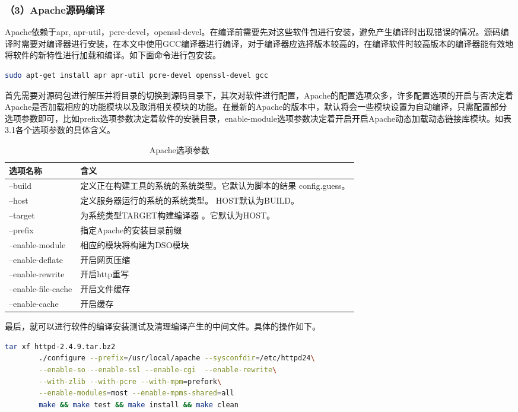 		\subsubsection{（3）Apache源码编译}
		Apache依赖于apr, apr-util，pcre-devel，openssl-devel。在编译前需要先对这些软件包进行安装，避免产生编译时出现错误的情况。源码编译时需要对编译器进行安装，在本文中使用GCC编译器进行编译，对于编译器应选择版本较高的，在编译软件时较高版本的编译器能有效地将软件的新特性进行加载和编译。如下面命令进行包安装。
		\begin{lstlisting}[language=bash]
		sudo apt-get install apr apr-util pcre-devel openssl-devel gcc
		\end{lstlisting}
		首先需要对源码包进行解压并将目录的切换到源码目录下，其次对软件进行配置，Apache的配置选项众多，许多配置选项的开启与否决定着Apache是否加载相应的功能模块以及取消相关模块的功能。在最新的Apache的版本中，默认将会一些模块设置为自动编译，只需配置部分选项参数即可，比如prefix选项参数决定着软件的安装目录，enable-module选项参数决定着开启开启Apache动态加载动态链接库模块。如表3.1各个选项参数的具体含义。
		\begin{table}[!htbp]
			\centering
			\begin{tabular}{ll}	
				\toprule
				选项名称& 含义\\
				\midrule
				--build&定义正在构建工具的系统的系统类型。它默认为脚本的结果 config.guess。\\
				--host&定义服务器运行的系统的系统类型。 HOST默认为BUILD。\\
				--target&为系统类型TARGET构建编译器 。它默认为HOST。\\
				--prefix& 指定Apache的安装目录前缀\\
				--enable-module&相应的模块将构建为DSO模块\\
				--enable-deflate&开启网页压缩\\
				--enable-rewrite&开启http重写\\
				--enable-file-cache&开启文件缓存\\
				--enable-cache&开启缓存\\
				\bottomrule
			\end{tabular}
		\caption{Apache选项参数}
		\end{table}
	最后，就可以进行软件的编译安装测试及清理编译产生的中间文件。具体的操作如下。
	\begin{lstlisting}[language=bash]
		tar xf httpd-2.4.9.tar.bz2
		./configure --prefix=/usr/local/apache --sysconfdir=/etc/httpd24\
		--enable-so --enable-ssl --enable-cgi  --enable-rewrite\
		--with-zlib --with-pcre --with-mpm=prefork\
		--enable-modules=most --enable-mpms-shared=all
		make && make test && make install && make clean
	\end{lstlisting}
